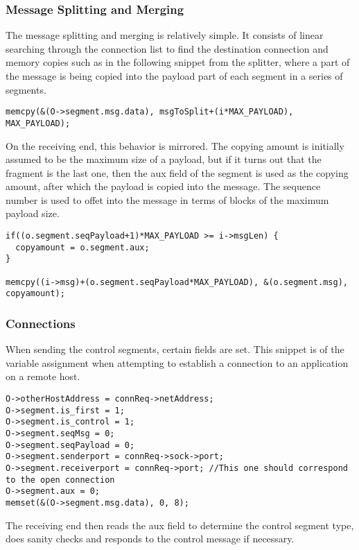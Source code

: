 \subsubsection{Message Splitting and Merging}
The message splitting and merging is relatively simple. It consists of linear searching through the connection list to find the destination connection and memory copies such as in the following snippet from the splitter, where a part of the message is being copied into the payload part of each segment in a series of segments.
\begin{lstlisting}
memcpy(&(O->segment.msg.data), msgToSplit+(i*MAX_PAYLOAD), MAX_PAYLOAD);
\end{lstlisting}

On the receiving end, this behavior is mirrored. The copying amount is initially assumed to be the maximum size of a payload, but if it turns out that the fragment is the last one, then the aux field of the segment is used as the copying amount, after which the payload is copied into the message. The sequence number is used to offet into the message in terms of blocks of the maximum payload size.
\begin{lstlisting}
if((o.segment.seqPayload+1)*MAX_PAYLOAD >= i->msgLen) {
  copyamount = o.segment.aux;
}

memcpy((i->msg)+(o.segment.seqPayload*MAX_PAYLOAD), &(o.segment.msg), copyamount);
\end{lstlisting}

\subsubsection{Connections}
When sending the control segments, certain fields are set. This snippet is of the variable assignment when attempting to establish a connection to an application on a remote host.
\begin{lstlisting}
O->otherHostAddress = connReq->netAddress;
O->segment.is_first = 1;
O->segment.is_control = 1;
O->segment.seqMsg = 0;
O->segment.seqPayload = 0;
O->segment.senderport = connReq->sock->port;
O->segment.receiverport = connReq->port; //This one should correspond to the open connection
O->segment.aux = 0;
memset(&(O->segment.msg.data), 0, 8);
\end{lstlisting}

The receiving end then reads the aux field to determine the control segment type, does sanity checks and responds to the control message if necessary.





\hfill \break
